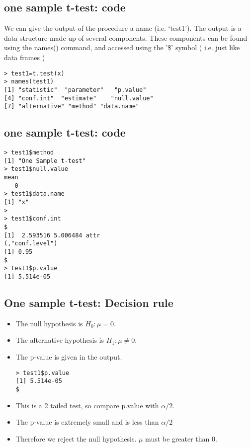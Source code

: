 \documentclass[a4paper,12pt]{article}
\begin{document}
\subsection{ one sample t-test: code}
We can give the output of the procedure a name (i.e. `test1').
The output is a data structure made up of several components.
These components can be found using the names() command, and accessed using the
'\$' symbol ( i.e. just like data frames )
\begin{verbatim}
> test1=t.test(x)
> names(test1)
[1] "statistic"  "parameter"   "p.value"
[4] "conf.int"  "estimate"    "null.value"
[7] "alternative" "method" "data.name"
\end{verbatim}

\subsection{ one sample t-test: code}

\begin{verbatim}
> test1$method
[1] "One Sample t-test"
> test1$null.value
mean
   0
> test1$data.name
[1] "x"
>
> test1$conf.int                                                            $
[1]  2.593516 5.006484 attr
(,"conf.level")
[1] 0.95                                                                    $
> test1$p.value
[1] 5.514e-05
\end{verbatim}


\subsection[containsverbatim]{One sample t-test: Decision rule}
\begin{itemize}
\item The null hypothesis is $H_{0}: \mu = 0$.
\item The alternative hypothesis is $H_{1}: \mu \neq 0$.
\item The p-value is given in the output.
\begin{verbatim}
> test1$p.value
[1] 5.514e-05                                                           $
\end{verbatim}
\item This is a 2 tailed test, so compare p.value with $\alpha/2$.
\item The p-value is extremely small and is less than $\alpha/2$
\item Therefore we reject the null hypothesis. $\mu$ must be greater than 0.
\end{itemize}
\end{document}

